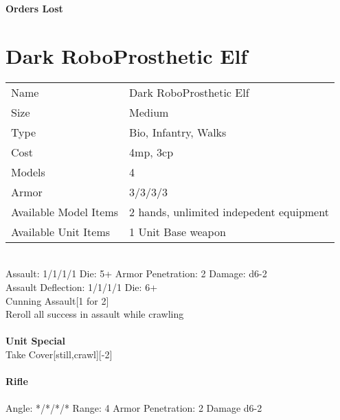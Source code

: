 {\bf Orders Lost }

\noindent 
\pagebreak

\section{ Dark RoboProsthetic Elf }

\begin{tabular}{ll}
  Name & Dark RoboProsthetic Elf \\
  Size & Medium\\
  Type & Bio, Infantry, Walks\\
  Cost & 4mp, 3cp\\
  Models & 4\\
  Armor & 3/3/3/3\\
  Available Model Items & 2 hands, unlimited indepedent equipment \\
  Available Unit Items & 1 Unit Base weapon \\
\end{tabular}

\ \\
Assault: 1/1/1/1 Die: 5+ Armor Penetration: 2 Damage: d6-2 \\
Assault Deflection: 1/1/1/1 Die: 6+\\
\indent Cunning Assault[1 for 2]\\ Reroll all success in assault while crawling \\
\ \\

{\bf Unit Special} \\
Take Cover[still,crawl][-2]
\ \\
\ \\
{\bf Rifle } \\
\ \\
Angle: */*/*/* Range: 4 Armor Penetration: 2 Damage d6-2 \\
\indent  \\





